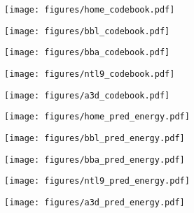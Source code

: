 \begin{minipage}{\textwidth}
    \footnotesize
    \subcaption{~~~~~~~~~~~~~~~~~~~~~~~~~~~~~~~~~~~~~~~~~~~~~~~~~~~~~~~~~~~~~~~~~~~~~~~~~~~~~~~~~~~~~~~~~~~~~~~~~~~~~~~~~~~~~~~~~~~~~~~~~~~~~~~~~~~~~~~~~~~~~~~~~~~~~~~~~~~~~~~~~~~~~~~~~~~~~~~~~~~~~~~~~~~~~~~~~~~~~~~~~}
    \label{fig:protein_data2}
    
    \begin{minipage}{0.19\textwidth}
        \texttt{[image: figures/home\_codebook.pdf]}
    \end{minipage}
    \begin{minipage}{0.19\textwidth}
        \texttt{[image: figures/bbl\_codebook.pdf]}
    \end{minipage}
    \begin{minipage}{0.19\textwidth}
        \texttt{[image: figures/bba\_codebook.pdf]}
    \end{minipage}
    \begin{minipage}{0.19\textwidth}
        \texttt{[image: figures/ntl9\_codebook.pdf]}
    \end{minipage}
    \begin{minipage}{0.19\textwidth}
        \texttt{[image: figures/a3d\_codebook.pdf]}
    \end{minipage}
\end{minipage}

\vspace{-0.2cm}

\begin{minipage}{\textwidth}
    \footnotesize
    \subcaption{~~~~~~~~~~~~~~~~~~~~~~~~~~~~~~~~~~~~~~~~~~~~~~~~~~~~~~~~~~~~~~~~~~~~~~~~~~~~~~~~~~~~~~~~~~~~~~~~~~~~~~~~~~~~~~~~~~~~~~~~~~~~~~~~~~~~~~~~~~~~~~~~~~~~~~~~~~~~~~~~~~~~~~~~~~~~~~~~~~~~~~~~~~~~~~~~~~~~~~~~~}
    \label{fig:protein_data3}
    
    \begin{minipage}{0.19\textwidth}
        \texttt{[image: figures/home\_pred\_energy.pdf]}
    \end{minipage}
    \begin{minipage}{0.19\textwidth}
        \texttt{[image: figures/bbl\_pred\_energy.pdf]}
    \end{minipage}
    \begin{minipage}{0.19\textwidth}
        \texttt{[image: figures/bba\_pred\_energy.pdf]}
    \end{minipage}
    \begin{minipage}{0.19\textwidth}
        \texttt{[image: figures/ntl9\_pred\_energy.pdf]}
    \end{minipage}
    \begin{minipage}{0.19\textwidth}
        \texttt{[image: figures/a3d\_pred\_energy.pdf]}
    \end{minipage}
\end{minipage}
